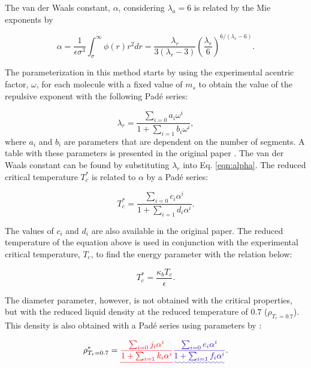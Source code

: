 \documentclass[
	12pt,				%
	openany,			%
	oneside,			%
	a4paper,			%
	english,			%
	brazil				%
	]{abntex2}
\providecommand{\DIFadd}[1]{{\protect\color{blue}\uwave{#1}}}
\providecommand{\DIFdel}[1]{{\protect\color{red}\sout{#1}}}
\providecommand{\DIFaddbegin}{}
\providecommand{\DIFaddend}{}
\providecommand{\DIFdelbegin}{}
\providecommand{\DIFdelend}{}
\providecommand{\DIFadd}[1]{{\protect\color{blue}\uwave{#1}}} %
\providecommand{\DIFdel}[1]{{\protect\color{red}\sout{#1}}}                      %
\providecommand{\DIFaddbegin}{} %
\providecommand{\DIFaddend}{} %
\providecommand{\DIFdelbegin}{} %
\providecommand{\DIFdelend}{} %
\begin{document}
The van der Waals constant, $\alpha$, considering $ \lambda_{a} = 6$ is related by the Mie exponents by

\begin{equation}
\alpha = \frac{1}{\epsilon\sigma^{3    }} \int_{\sigma}^{\infty} \phi(r)r^{2}dr = \frac{\lambda_{r}}{3(\lambda_{r}-3)}\left(\frac{\lambda_r}{6}\right)^{6/(\lambda_{r} - 6)}  .
\label{eqn:alpha}
\end{equation}

The parameterization in this method starts by using the experimental acentric factor, $\omega$, for each molecule with a fixed value of $ m_{s}$ \DIFaddbegin \DIFadd{in order }\DIFaddend to obtain the value of the repulsive exponent with the following Padé series:

\begin{equation}
\lambda_{r} = \frac{\sum_{i=0} a_{i}\omega^{i}}{1+\sum_{i=1} b_{i}\omega^{i}} ,  
\label{eqn:lambdaco}
\end{equation}
where $a_{i}$ and $b_{i}$ are parameters that are dependent on the number of segments. A table with these parameters is presented in the original paper \cite{mejia2014}. The van der Waals constant can be found by substituting $\lambda_{r}$ into Eq. \eqref{eqn:alpha}. The reduced critical temperature $T_{c}^{*}$ is related to $\alpha$ by a Padé series: 

\begin{equation}
T_{c}^{*} = \frac{\sum_{i=0} c_{i}\alpha^{i}}{1+\sum_{i=1} d_{i}\alpha^{i}}   .
\label{eqn:tc}
\end{equation}

The values of $c_{i}$ and $d_{i}$ are also available in the original paper. The reduced temperature of the equation above is used in conjunction with the experimental critical temperature, $ T_{c}$, to find the energy parameter with the relation below:

\begin{equation}
T_{c}^{*} = \frac{\kappa_{b}T_{c}}{\epsilon}   .
\label{eqn:epscorre}
\end{equation}

The diameter parameter, however, is not obtained with the critical properties, but with the reduced liquid density at the reduced temperature of $0.7$ ($\rho_{T_{r}=0.7}$). This density is also obtained with a Padé series using parameters by :

\begin{equation}
\rho_{T_{r}=0.7}^{*} = \DIFdelbegin \DIFdel{\frac{\sum_{i=0} j_{i}\alpha^{i}}{1+\sum_{i=1} k_{i}\alpha^{i}} }\DIFdelend \DIFaddbegin \DIFadd{\frac{\sum_{i=0} e_{i}\alpha^{i}}{1+\sum_{i=1} f_{i}\alpha^{i}} }\DIFaddend .
\label{eqn:denscorre}
\end{equation}
\end{document}
